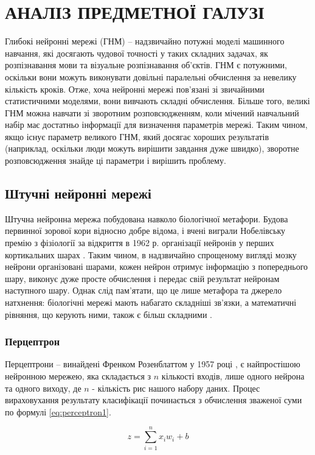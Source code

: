 \chapter{АНАЛІЗ ПРЕДМЕТНОЇ ГАЛУЗІ}
Глибокі нейронні мережі (ГНМ) -- надзвичайно потужні моделі машинного навчання,
які досягають чудової точності у таких складних задачах, як
розпізнавання мови та візуальне розпізнавання об’єктів.
ГНМ є потужними, оскільки вони можуть виконувати
довільні паралельні обчислення за невелику кількість кроків.
Отже, хоча нейронні мережі пов’язані
зі звичайними статистичними моделями, вони вивчають складні
обчислення. Більше того, великі ГНМ можна навчати зі
зворотним розповсюдженням, коли мічений навчальний набір має
достатньо інформації для визначення параметрів мережі. Таким
чином, якщо існує параметр великого ГНМ, який досягає хороших
результатів (наприклад, оскільки люди можуть вирішити завдання
дуже швидко), зворотне розповсюдження знайде ці
параметри і вирішить проблему.

\section{Штучні нейронні мережі}
Штучна нейронна мережа побудована навколо біологічної метафори.
Будова первинної зорової кори відносно добре відома,
і вчені виграли Нобелівську премію з фізіології за відкриття в
1962 р. організації нейронів у перших кортикальних
шарах \cite{cortex-stuff}. Таким чином, в надзвичайно
спрощеному вигляді
мозку нейрони організовані шарами, кожен нейрон отримує
інформацію з попереднього шару, виконує дуже просте
обчислення і передає свій результат нейронам наступного
шару. Однак слід пам’ятати, що це лише метафора та джерело
натхнення: біологічні мережі мають набагато складніші
зв’язки, а математичні рівняння, що керують ними, також
є більш складними \cite{cortex-equations}.

\subsection{Перцептрон}
Перцептрони -- винайдені Френком Розенблаттом у 1957 році
\cite{rozenblatt}, є найпростішою
нейронною мережею, яка складається з $n$ кількості входів, лише одного
нейрона та одного виходу, де $n$ - кількість рис нашого набору
даних. Процес вираховухання результату класифікації починається
з обчислення зваженої суми
по формулі \ref{eq:perceptron1}.

\begin{equation}
    z = \sum^n_{i=1} x_i w_i + b
    \label{eq:perceptron1}
\end{equation}

